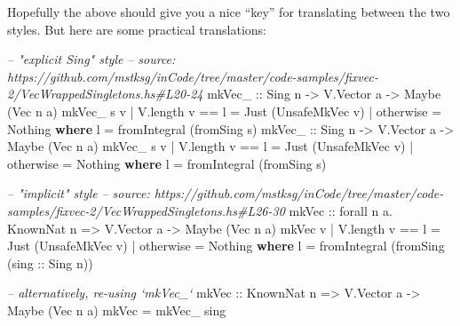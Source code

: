 \documentclass[]{article}
\newenvironment{Shaded}{}{}
\newcommand{\KeywordTok}[1]{\textcolor[rgb]{0.00,0.44,0.13}{\textbf{#1}}}
\newcommand{\DataTypeTok}[1]{\textcolor[rgb]{0.56,0.13,0.00}{#1}}
\newcommand{\CommentTok}[1]{\textcolor[rgb]{0.38,0.63,0.69}{\textit{#1}}}
\newcommand{\OtherTok}[1]{\textcolor[rgb]{0.00,0.44,0.13}{#1}}
\newcommand{\FunctionTok}[1]{\textcolor[rgb]{0.02,0.16,0.49}{#1}}
\newcommand{\NormalTok}[1]{#1}
\begin{document}
Hopefully the above should give you a nice ``key'' for translating between the
two styles. But here are some practical translations:

\begin{Shaded}
\begin{Highlighting}[]
\CommentTok{-- "explicit Sing" style}
\CommentTok{-- source: https://github.com/mstksg/inCode/tree/master/code-samples/fixvec-2/VecWrappedSingletons.hs#L20-24}
\OtherTok{mkVec_ ::} \DataTypeTok{Sing}\NormalTok{ n }\OtherTok{->} \DataTypeTok{V.Vector}\NormalTok{ a }\OtherTok{->} \DataTypeTok{Maybe}\NormalTok{ (}\DataTypeTok{Vec}\NormalTok{ n a)}
\NormalTok{mkVec_ s v }\FunctionTok{|}\NormalTok{ V.length v }\FunctionTok{==}\NormalTok{ l }\FunctionTok{=} \DataTypeTok{Just}\NormalTok{ (}\DataTypeTok{UnsafeMkVec}\NormalTok{ v)}
           \FunctionTok{|}\NormalTok{ otherwise       }\FunctionTok{=} \DataTypeTok{Nothing}
  \KeywordTok{where}
\NormalTok{    l }\FunctionTok{=}\NormalTok{ fromIntegral (fromSing s)}
\OtherTok{mkVec_ ::} \DataTypeTok{Sing}\NormalTok{ n }\OtherTok{->} \DataTypeTok{V.Vector}\NormalTok{ a }\OtherTok{->} \DataTypeTok{Maybe}\NormalTok{ (}\DataTypeTok{Vec}\NormalTok{ n a)}
\NormalTok{mkVec_ s v }\FunctionTok{|}\NormalTok{ V.length v }\FunctionTok{==}\NormalTok{ l }\FunctionTok{=} \DataTypeTok{Just}\NormalTok{ (}\DataTypeTok{UnsafeMkVec}\NormalTok{ v)}
           \FunctionTok{|}\NormalTok{ otherwise       }\FunctionTok{=} \DataTypeTok{Nothing}
  \KeywordTok{where}
\NormalTok{    l }\FunctionTok{=}\NormalTok{ fromIntegral (fromSing s)}


\CommentTok{-- "implicit" style}
\CommentTok{-- source: https://github.com/mstksg/inCode/tree/master/code-samples/fixvec-2/VecWrappedSingletons.hs#L26-30}
\OtherTok{mkVec ::}\NormalTok{ forall n a}\FunctionTok{.} \DataTypeTok{KnownNat}\NormalTok{ n }\OtherTok{=>} \DataTypeTok{V.Vector}\NormalTok{ a }\OtherTok{->} \DataTypeTok{Maybe}\NormalTok{ (}\DataTypeTok{Vec}\NormalTok{ n a)}
\NormalTok{mkVec v }\FunctionTok{|}\NormalTok{ V.length v }\FunctionTok{==}\NormalTok{ l }\FunctionTok{=} \DataTypeTok{Just}\NormalTok{ (}\DataTypeTok{UnsafeMkVec}\NormalTok{ v)}
        \FunctionTok{|}\NormalTok{ otherwise       }\FunctionTok{=} \DataTypeTok{Nothing}
  \KeywordTok{where}
\NormalTok{    l }\FunctionTok{=}\NormalTok{ fromIntegral (fromSing (}\OtherTok{sing ::} \DataTypeTok{Sing}\NormalTok{ n))}

\CommentTok{-- alternatively, re-using `mkVec_`}
\OtherTok{mkVec ::} \DataTypeTok{KnownNat}\NormalTok{ n }\OtherTok{=>} \DataTypeTok{V.Vector}\NormalTok{ a }\OtherTok{->} \DataTypeTok{Maybe}\NormalTok{ (}\DataTypeTok{Vec}\NormalTok{ n a)}
\NormalTok{mkVec }\FunctionTok{=}\NormalTok{ mkVec_ sing}
\end{Highlighting}
\end{Shaded}
\end{document}
